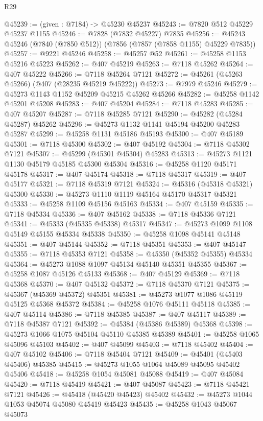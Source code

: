 \begin{lexlean}{R29}
\begin{coremodule}
@45239 := (given : @7184) -> @45230 @45237
@45243 := @7820 @512 @45229 @45237 @1155
@45246 := @7828 (@7832 @45227) @7835
@45256 := @45243 @45246 (@7840 (@7850 @512)) (@7856 (@7857 (@7858 @1155) @45229 @7835))
@45257 := @9221 @45246
@45258 := @45257 @52
@45261 := @45258 @1153 @45216 @45223
@45262 := @407 @45219
@45263 := @7118 @45262
@45264 := @407 @45222
@45266 := @7118 @45264 @7121
@45272 := @45261 (@45263 @45266) (@407 (@28235 @45219 @45222))
@45273 := @7979 @45246
@45279 := @45273 @1143 @1152 @45209 @45215 @45262 @45266
@45282 := @45258 @1142 @45201 @45208
@45283 := @407 @45204
@45284 := @7118 @45283
@45285 := @407 @45207
@45287 := @7118 @45285 @7121
@45290 := @45282 (@45284 @45287) @45262
@45296 := @45273 @1132 @1141 @45194 @45200 @45283 @45287
@45299 := @45258 @1131 @45186 @45193
@45300 := @407 @45189
@45301 := @7118 @45300
@45302 := @407 @45192
@45304 := @7118 @45302 @7121
@45307 := @45299 (@45301 @45304) @45283
@45313 := @45273 @1121 @1130 @45179 @45185 @45300 @45304
@45316 := @45258 @1120 @45171 @45178
@45317 := @407 @45174
@45318 := @7118 @45317
@45319 := @407 @45177
@45321 := @7118 @45319 @7121
@45324 := @45316 (@45318 @45321) @45300
@45330 := @45273 @1110 @1119 @45164 @45170 @45317 @45321
@45333 := @45258 @1109 @45156 @45163
@45334 := @407 @45159
@45335 := @7118 @45334
@45336 := @407 @45162
@45338 := @7118 @45336 @7121
@45341 := @45333 (@45335 @45338) @45317
@45347 := @45273 @1099 @1108 @45149 @45155 @45334 @45338
@45350 := @45258 @1098 @45141 @45148
@45351 := @407 @45144
@45352 := @7118 @45351
@45353 := @407 @45147
@45355 := @7118 @45353 @7121
@45358 := @45350 (@45352 @45355) @45334
@45364 := @45273 @1088 @1097 @45134 @45140 @45351 @45355
@45367 := @45258 @1087 @45126 @45133
@45368 := @407 @45129
@45369 := @7118 @45368
@45370 := @407 @45132
@45372 := @7118 @45370 @7121
@45375 := @45367 (@45369 @45372) @45351
@45381 := @45273 @1077 @1086 @45119 @45125 @45368 @45372
@45384 := @45258 @1076 @45111 @45118
@45385 := @407 @45114
@45386 := @7118 @45385
@45387 := @407 @45117
@45389 := @7118 @45387 @7121
@45392 := @45384 (@45386 @45389) @45368
@45398 := @45273 @1066 @1075 @45104 @45110 @45385 @45389
@45401 := @45258 @1065 @45096 @45103
@45402 := @407 @45099
@45403 := @7118 @45402
@45404 := @407 @45102
@45406 := @7118 @45404 @7121
@45409 := @45401 (@45403 @45406) @45385
@45415 := @45273 @1055 @1064 @45089 @45095 @45402 @45406
@45418 := @45258 @1054 @45081 @45088
@45419 := @407 @45084
@45420 := @7118 @45419
@45421 := @407 @45087
@45423 := @7118 @45421 @7121
@45426 := @45418 (@45420 @45423) @45402
@45432 := @45273 @1044 @1053 @45074 @45080 @45419 @45423
@45435 := @45258 @1043 @45067 @45073

\end{coremodule}
\end{lexlean}
